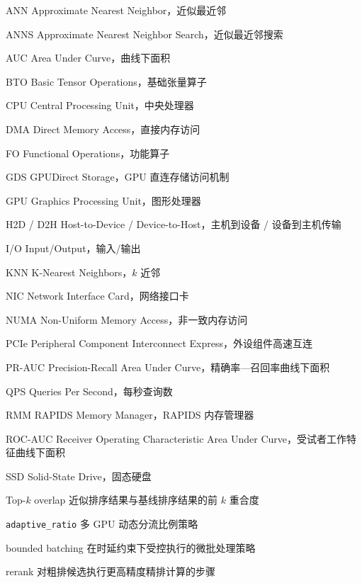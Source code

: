 
\begin{denotation}[4.8cm]
  \item[ANN] Approximate Nearest Neighbor，近似最近邻
  \item[ANNS] Approximate Nearest Neighbor Search，近似最近邻搜索
  \item[AUC] Area Under Curve，曲线下面积
  \item[BTO] Basic Tensor Operations，基础张量算子
  \item[CPU] Central Processing Unit，中央处理器
  \item[DMA] Direct Memory Access，直接内存访问
  \item[FO] Functional Operations，功能算子
  \item[GDS] GPUDirect Storage，GPU 直连存储访问机制
  \item[GPU] Graphics Processing Unit，图形处理器
  \item[H2D / D2H] Host-to-Device / Device-to-Host，主机到设备 / 设备到主机传输
  \item[I/O] Input/Output，输入/输出
  \item[KNN] K-Nearest Neighbors，$k$ 近邻
  \item[NIC] Network Interface Card，网络接口卡
  \item[NUMA] Non-Uniform Memory Access，非一致内存访问
  \item[PCIe] Peripheral Component Interconnect Express，外设组件高速互连
  \item[PR-AUC] Precision-Recall Area Under Curve，精确率—召回率曲线下面积
  \item[QPS] Queries Per Second，每秒查询数
  \item[RMM] RAPIDS Memory Manager，RAPIDS 内存管理器
  \item[ROC-AUC] Receiver Operating Characteristic Area Under Curve，受试者工作特征曲线下面积
  \item[SSD] Solid-State Drive，固态硬盘
  \item[Top-$k$ overlap] 近似排序结果与基线排序结果的前 $k$ 重合度
  \item[\texttt{adaptive\_ratio}] 多 GPU 动态分流比例策略
  \item[bounded batching] 在时延约束下受控执行的微批处理策略
  \item[rerank] 对粗排候选执行更高精度精排计算的步骤
\end{denotation}

